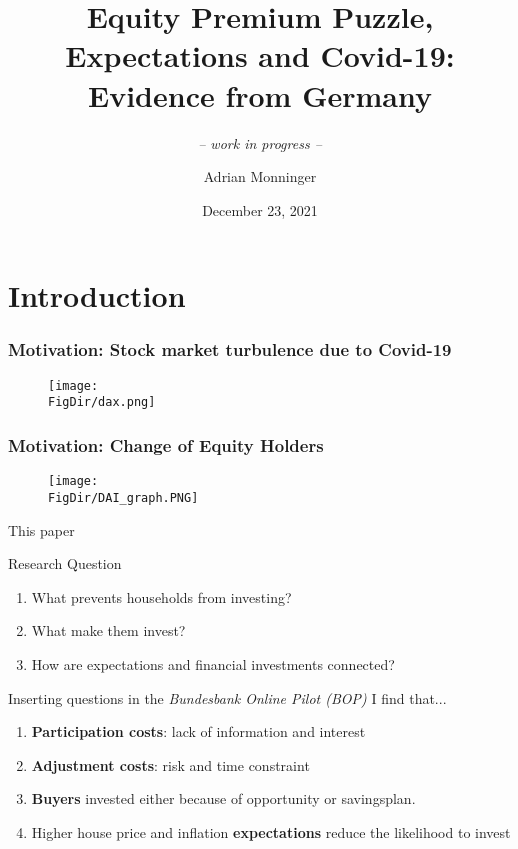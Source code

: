 \documentclass[pdflatex]{beamer}
\title[EPP, Expectations and Covid-19] {Equity Premium Puzzle, Expectations and Covid-19:\\ Evidence from Germany}
\subtitle{ \vspace{0.25em} \textit{-- work in progress --} }
\author[A. Monninger]{Adrian Monninger\inst{1}}
\institute[]{\inst{1} Johns Hopkins University}
\date{December 23, 2021}
\begin{document}

\begin{frame}
	\titlepage
\end{frame}


\section{Introduction}
\begin{frame}[label = motivation_2]
	\frametitle{Motivation: Stock market turbulence due to Covid-19}
	\begin{figure}
		\centering
		\texttt{[image: \\FigDir/dax.png]}
	\end{figure}
	\hyperlink{sp500}{}
	\hyperlink{eurostoxx50}{}
\end{frame}

\begin{frame}[label = motivation_2]
	\frametitle{Motivation: Change of Equity Holders}
	\begin{figure}
		\centering
		\texttt{[image: \\FigDir/DAI\_graph.PNG]}
	\end{figure}
\end{frame}

\begin{frame}{This paper}
	
	\begin{block}{Research Question}
		{\begin{enumerate}
				\item What prevents households from investing?
				\item What make them invest?
				\item How are expectations and financial investments connected?
		\end{enumerate}}
	\end{block}
	\vspace{1em}
	\pause
	\begin{block}{Inserting questions in the \textit{Bundesbank Online Pilot (BOP)} I find that...}
		{
			\pause
			\begin{enumerate}
				\item \textbf{Participation costs}: lack of information and interest
				\item \textbf{Adjustment costs}: risk and time constraint
				\item \textbf{Buyers} invested either because of opportunity or savingsplan. 
				\item Higher house price and inflation \textbf{expectations} reduce the likelihood to invest
			\end{enumerate}
		}
		
	\end{block}
\end{frame}
\end{document}
